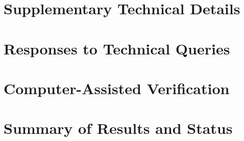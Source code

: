 \documentclass[11pt,a4paper]{report}
\begin{document}
\chapter{Supplementary Technical Details}
\label{ch:supplementary}







\chapter{Responses to Technical Queries}
\label{ch:review-response}




\chapter{Computer-Assisted Verification}
\label{ch:computer-verify}


\chapter{Summary of Results and Status}
\label{ch:resolution-summary}



\end{document}
